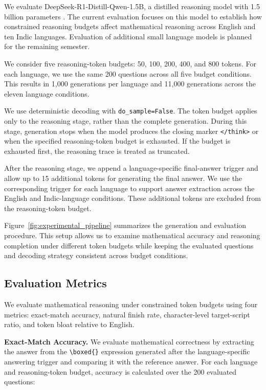 \documentclass[11pt]{article}
\begin{document}
We evaluate DeepSeek-R1-Distill-Qwen-1.5B, a distilled reasoning model with 1.5 billion parameters \citep{deepseek2025r1}. The current evaluation focuses on this model to establish how constrained reasoning budgets affect mathematical reasoning across English and ten Indic languages. Evaluation of additional small language models is planned for the remaining semester.

We consider five reasoning-token budgets: 50, 100, 200, 400, and 800 tokens. For each language, we use the same 200 questions across all five budget conditions. This results in 1,000 generations per language and 11,000 generations across the eleven language conditions.

We use deterministic decoding with \texttt{do\_sample=False}. The token budget applies only to the reasoning stage, rather than the complete generation. During this stage, generation stops when the model produces the closing marker \texttt{</think>} or when the specified reasoning-token budget is exhausted. If the budget is exhausted first, the reasoning trace is treated as truncated.

After the reasoning stage, we append a language-specific final-answer trigger and allow up to 15 additional tokens for generating the final answer. We use the corresponding trigger for each language to support answer extraction across the English and Indic-language conditions. These additional tokens are excluded from the reasoning-token budget.

Figure~\ref{fig:experimental_pipeline} summarizes the generation and evaluation procedure. This setup allows us to examine mathematical accuracy and reasoning completion under different token budgets while keeping the evaluated questions and decoding strategy consistent across budget conditions.



\subsection{Evaluation Metrics}
\label{sec:eval_metrics}

We evaluate mathematical reasoning under constrained token budgets using four metrics: exact-match accuracy, natural finish rate, character-level target-script ratio, and token bloat relative to English.

\textbf{Exact-Match Accuracy.}
We evaluate mathematical correctness by extracting the answer from the \texttt{\textbackslash boxed\{\}} expression generated after the language-specific answering trigger and comparing it with the reference answer. For each language and reasoning-token budget, accuracy is calculated over the 200 evaluated questions:
\end{document}
